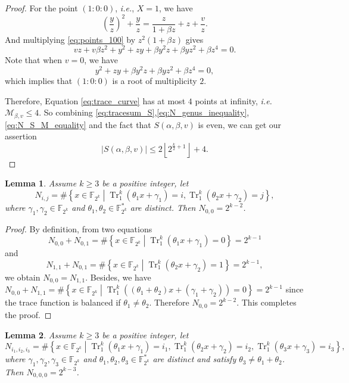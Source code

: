 \documentclass{article}
\newcommand{\F}{\mathbb{F}}
\newcommand{\0}{\textbf{0}}
\newcommand{\1}{\textbf{1}}
\newcommand{\TRACE}{\operatorname{Tr}_1^k}
\theoremstyle{plain}
\newtheorem{lemma}{Lemma}
\begin{document}
\begin{proof}
        For the point $(1 : 0 : 0)$, \emph{i.e.}, $X = 1$, we have
        \begin{equation}\label{eq:points_100}
            \left( \frac{y}{z} \right)^2+\frac{y}{z}=\frac{z}{1+\beta z}+z+\frac{v}{z}.
        \end{equation}
        And multiplying \eqref{eq:points_100} by $z^2(1+\beta z)$ gives
        \[vz+v\beta z^2+y^2+zy+\beta y^2z+\beta yz^2+\beta z^4=0.\]
        Note that when $v=0$, we have
        \[y^2+zy+\beta y^2z+\beta yz^2+\beta z^4=0,\]
        which implies that $(1:0:0)$ is a root of multiplicity $2$.

        Therefore, Equation \eqref{eq:trace_curve} has at most $4$ points at infinity, \emph{i.e.}
        $\mathcal{M}_{\beta,v}\le 4$.
        So combining \eqref{eq:tracesum_S},\eqref{eq:N_genus_inequality},\eqref{eq:N_S_M_equality} and the fact that
        $S(\alpha,\beta,v)$ is even, we can get our assertion
        \[\left\lvert S(\alpha,\beta,v)\right\rvert \le 2\left\lfloor 2^{\frac{k}{2}+1}\right\rfloor+4.\]
    \end{proof}

    \begin{lemma}\label{lemma:N_ij_trace}
        Assume  $k\ge 3$ be a positive integer, let
        \[ N_{i,j} =\#\left\{x\in\F_{2^k}\middle|\TRACE\left(\theta_1x+\gamma_1\right)=i,\TRACE\left(\theta_2x+\gamma_2\right)=j\right\}, \]
        where  $\gamma_1,\gamma_2\in\F_{2^k}$ and $\theta_1,\theta_2\in\F_{2^k}^*$ are distinct. Then $N_{0,0} =2^{k-2}$.
    \end{lemma}

   \begin{proof}
        By definition, from two equations
        \[N_{0,0}+N_{0,1}=\#\left\{x\in\F_{2^k}\middle|\TRACE\left(\theta_1x+\gamma_1\right)=0\right\}=2^{k-1}\]
        and
        \[N_{1,1}+N_{0,1}=\#\left\{x\in\F_{2^k}\middle|\TRACE\left(\theta_2x+\gamma_2\right)=1\right\}=2^{k-1},\]
        we obtain $N_{0,0} = N_{1,1}$.
        Besides, we have $N_{0,0}+N_{1,1} = \#\left\{x\in\F_{2^k}\middle|\TRACE\left((\theta_1+\theta_2)x+(\gamma_1+\gamma_2)\right)=0\right\}=2^{k-1}$
        since the trace function is balanced if $\theta_1\ne\theta_2$.
        Therefore $N_{0,0}=2^{k-2}$. This completes the proof.
   \end{proof}

    \begin{lemma}\label{lemma:N_ijk_trace}
        Assume $k\ge 3$ be a positive integer, let
        \[ N_{i_1,i_2,i_3}=\#\left\{x\in\F_{2^k}\middle| \TRACE\left(\theta_1x+\gamma_1\right)=i_1,\TRACE\left(\theta_2x+\gamma_2\right)=i_2,\TRACE\left(\theta_3x+\gamma_3\right)=i_3 \right\},\]
        where  $\gamma_1,\gamma_2,\gamma_3\in\F_{2^k}$ and $\theta_1,\theta_2,\theta_3\in\F_{2^k}^*$ are distinct and satisfy
        $\theta_3\ne\theta_1+\theta_2$. Then $N_{0,0,0}= 2^{k-3}$.
    \end{lemma}
\end{document}
